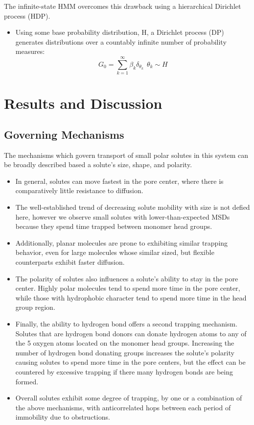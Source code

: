 \documentclass{article}
\begin{document}
  The infinite-state HMM overcomes this drawback using a hierarchical
  Dirichlet process (HDP).
  \begin{itemize}
    \item Using some base probability distribution, H, a Dirichlet process 
    (DP) generates distributions over a countably infinite number of 
    probability measures:
    \begin{equation}
      G_0 = \sum_{k=1}^{\infty} \beta_k \delta_{\theta_k} ~~ \theta_k \sim H
    \end{equation}
  \end{itemize}
   
  \section{Results and Discussion}
  
  \subsection{Governing Mechanisms}\label{section:mechanism_overview}

  The mechanisms which govern transport of small polar solutes in this 
  system can be broadly described based a solute's size, shape, and polarity.
  \begin{itemize}
    \item In general, solutes can move fastest in the pore center, where
    there is comparatively little resistance to diffusion. 
  	\item The well-established trend of decreasing solute mobility with 
  	size is not defied here, however we observe small solutes with lower-than-expected
  	MSDs because they spend time trapped between monomer head groups.
  	\item Additionally, planar molecules are prone to exhibiting similar
  	trapping behavior, even for large molecules whose similar sized, but flexible
  	counterparts exhibit faster diffusion.  %
  	\item The polarity of solutes also influences a solute's ability to stay in
  	the pore center. Highly polar molecules tend to spend more time in the pore center,
  	while those with hydrophobic character tend to spend more time in the head group
  	region.
  	\item Finally, the ability to hydrogen bond offers a second trapping mechanism. 
  	Solutes that are hydrogen bond donors can donate hydrogen atoms to
  	any of the 5 oxygen atoms located on the monomer head groups. Increasing the 
  	number of hydrogen bond donating groups increases the solute's polarity causing
  	solutes to spend more time in the pore centers, but the effect can be countered
  	by excessive trapping if there many hydrogen bonds are being formed.
  	\item Overall solutes exhibit some degree of trapping, by one or a combination of the above
  	mechanisms, with anticorrelated hops between each period of immobility due to 
  	obstructions.
  \end{itemize}
  
\end{document}
